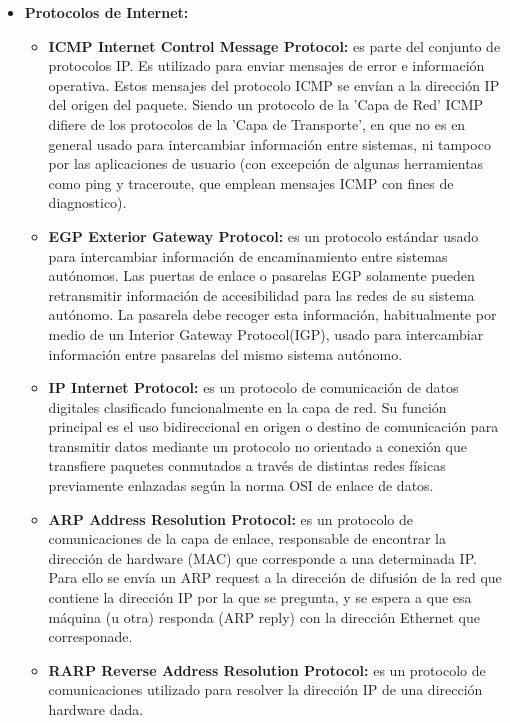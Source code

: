\documentclass[a4paper,11pt]{article}
\begin{document}
\begin{itemize}
\item \textbf{Protocolos de Internet:}

	\begin{itemize}
		\item \textbf{ICMP Internet Control Message Protocol:} es parte del conjunto de protocolos IP. Es utilizado para enviar mensajes de error e información operativa. Estos mensajes del protocolo ICMP se envían a la dirección IP del origen del paquete. Siendo un protocolo de la 'Capa de Red' ICMP difiere de los protocolos de la 'Capa de Transporte', en que no es en general usado para intercambiar información entre sistemas, ni tampoco por las aplicaciones de usuario (con excepción de algunas herramientas como ping y traceroute, que emplean mensajes ICMP con fines de diagnostico). 
		
		\item \textbf{EGP Exterior Gateway Protocol:} es un protocolo estándar usado para intercambiar información de encaminamiento entre sistemas autónomos. Las puertas de enlace o pasarelas EGP solamente pueden retransmitir información de accesibilidad para las redes de su sistema autónomo. La pasarela debe recoger esta información, habitualmente por medio de un Interior Gateway Protocol(IGP), usado para intercambiar información entre pasarelas del mismo sistema autónomo.
		
		\item \textbf{IP Internet Protocol:} es un protocolo de comunicación de datos digitales clasificado funcionalmente en la capa de red. Su función principal es el uso bidireccional en origen o destino de comunicación para transmitir datos mediante un protocolo no orientado a conexión que transfiere paquetes conmutados a través de distintas redes físicas previamente enlazadas según la norma OSI de enlace de datos.
		
		\item \textbf{ARP Address Resolution Protocol:} es un protocolo de comunicaciones de la capa de enlace, responsable de encontrar la dirección de hardware (MAC) que corresponde a una determinada IP. Para ello se envía un ARP request a la dirección de difusión de la red que contiene la dirección IP por la que se pregunta, y se espera a que esa máquina (u otra) responda (ARP reply) con la dirección Ethernet que corresponade.
		
		\item \textbf{RARP Reverse Address Resolution Protocol:} es un protocolo de comunicaciones utilizado para resolver la dirección IP de una dirección hardware dada. 
	\end{itemize}
\end{itemize}
\end{document}
